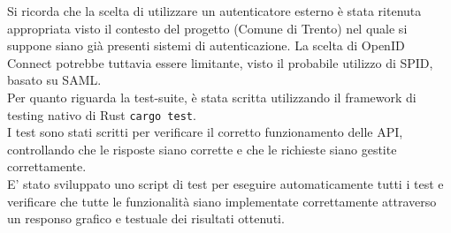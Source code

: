 \documentclass{article}
\begin{document}
\noindent
Si ricorda che la scelta di utilizzare un autenticatore esterno è stata ritenuta appropriata visto il contesto del progetto (Comune di Trento) nel quale si suppone siano già presenti sistemi di autenticazione.
La scelta di OpenID Connect potrebbe tuttavia essere limitante, visto il probabile utilizzo di SPID, basato su SAML.\\

\noindent
Per quanto riguarda la test-suite, è stata scritta utilizzando il framework di testing nativo di Rust \texttt{cargo test}.\\
I test sono stati scritti per verificare il corretto funzionamento delle API, controllando che le risposte siano corrette e che le richieste siano gestite correttamente.\\
E' stato sviluppato uno script di test per eseguire automaticamente tutti i test e verificare che tutte le funzionalità siano implementate correttamente attraverso un responso grafico e testuale dei risultati ottenuti.
\end{document}
